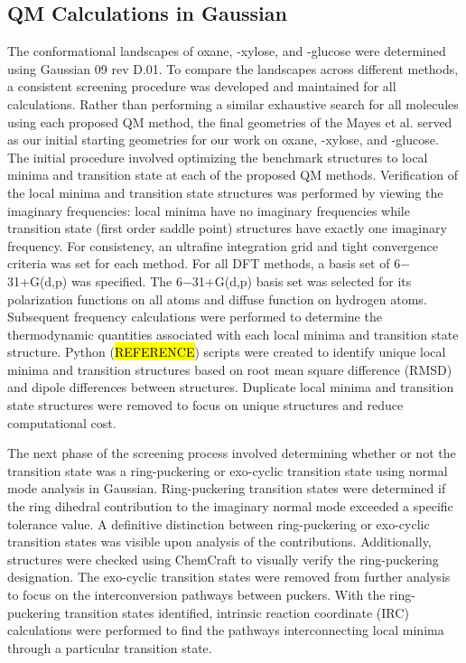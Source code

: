 \documentclass{article}
\begin{document}
\subsection{QM Calculations in Gaussian}
The conformational landscapes of oxane, \textbeta-xylose, and \textbeta-glucose were determined using Gaussian 09 rev D.01.\cite{Frisch2009} 
To compare the landscapes across different methods, a consistent screening procedure was developed and maintained for all calculations. 
Rather than performing a similar exhaustive search for all molecules using each proposed QM method, the final geometries of the Mayes et al. 
served as our initial starting geometries for our work on oxane, \textbeta-xylose, and \textbeta-glucose.\cite{Mayes2014} 
The initial procedure involved optimizing the benchmark structures to local minima and transition state at each of the proposed QM methods. 
Verification of the local minima and transition state structures was performed by viewing the imaginary frequencies: local minima have no imaginary 
frequencies while transition state (first order saddle point) structures have exactly one imaginary frequency. For consistency, an ultrafine integration 
grid and tight convergence criteria was set for each method. For all DFT methods, a basis set of 6$-$31+G(d,p) was specified. The 6$-$31+G(d,p) 
basis set was selected for its polarization functions on all atoms and diffuse function on hydrogen atoms. Subsequent frequency calculations were 
performed to determine the thermodynamic quantities associated with each local minima and transition state structure. Python (\hl{REFERENCE}) 
scripts were created to identify unique local minima and transition structures based on root mean square difference (RMSD) and dipole differences 
between structures. Duplicate local minima and transition state structures were removed to focus on unique structures and reduce computational cost. 
	
The next phase of the screening process involved determining whether or not the transition state was a ring-puckering or exo-cyclic transition state 
using normal mode analysis in Gaussian.\cite{Frisch2009} Ring-puckering transition states were determined if the ring dihedral contribution to the 
imaginary normal mode exceeded a specific tolerance value. A definitive distinction between ring-puckering or exo-cyclic transition states was visible 
upon analysis of the contributions. Additionally, structures were checked using ChemCraft to visually verify the ring-puckering designation.\cite{ChemCraft}
The exo-cyclic transition states were removed from further analysis to focus on the interconversion pathways between puckers. With the ring-puckering 
transition states identified, intrinsic reaction coordinate (IRC) calculations were performed to find the pathways interconnecting local minima through a 
particular transition state. 
\end{document}
